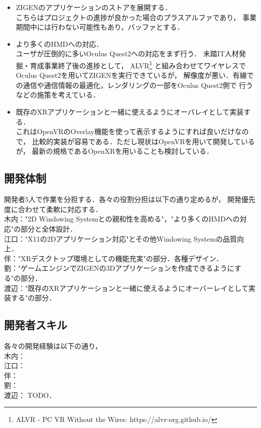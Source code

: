 \begin{itemize}
  \item ZIGENのアプリケーションのストアを展開する．\\
        こちらはプロジェクトの進捗が良かった場合のプラスアルファであり，
        事業期間中には行わない可能性もあり，バッファとする．

  \item より多くのHMDへの対応．\\
        ユーザが圧倒的に多いOculus Quest2への対応をまず行う．
        未踏IT人材発掘・育成事業終了後の進捗として，
        ALVR\footnote{ALVR - PC VR Without the Wires: https://alvr-org.github.io/}
        と組み合わせてワイヤレスでOculus Quest2を用いてZIGENを実行できているが，
        解像度が悪い．有線での通信や通信情報の最適化，レンダリングの一部をOculus Quest2側で
        行うなどの施策を考えている．

  \item 既存のXRアプリケーションと一緒に使えるようにオーバレイとして実装する．\\
        これはOpenVRのOverlay機能を使って表示するようにすれば良いだけなので，
        比較的実装が容易である．ただし現状はOpenVRを用いて開発しているが，
        最新の規格であるOpenXRを用いることも検討している．
\end{itemize}

\subsection{開発体制}

開発者5人で作業を分担する．各々の役割分担は以下の通り定めるが，
開発優先度に合わせて柔軟に対応する．\\
木内："2D Windowing Systemとの親和性を高める"，"より多くのHMDへの対応"の部分と全体設計．\\
江口："X11の2Dアプリケーション対応"とその他Windowing Systemの品質向上．\\
伴："XRデスクトップ環境としての機能充実"の部分．各種デザイン．\\
劉："ゲームエンジンでZIGENの3Dアプリケーションを作成できるようにする"の部分．\\
渡辺："既存のXRアプリケーションと一緒に使えるようにオーバーレイとして実装する"の部分．

\subsection{開発者スキル}

各々の開発経験は以下の通り，\\
木内：\\
江口：\\
伴：\\
劉：\\
渡辺： TODO．

